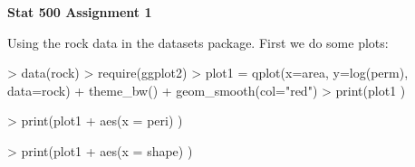 \documentclass[11pt]{article}
\begin{document}

\begin{center}
{\bf \Large Stat 500 Assignment 1\\}
 \end{center}
 
 Using the rock data in the datasets package. First we do some plots:\\
\begin{Schunk}
\begin{Sinput}
>  data(rock)
>   require(ggplot2)
>   plot1 = qplot(x=area, y=log(perm), data=rock) + theme_bw() + geom_smooth(col="red")
>    print(plot1 )
\end{Sinput}
\end{Schunk}
\begin{Schunk}
\begin{Sinput}
>    print(plot1 + aes(x = peri) )
\end{Sinput}
\end{Schunk}
\begin{Schunk}
\begin{Sinput}
>    print(plot1 + aes(x = shape) )
\end{Sinput}
\end{Schunk}
\end{document}
